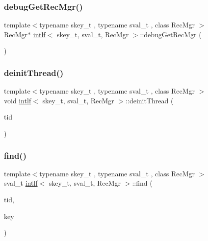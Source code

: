 \subsubsection{\texorpdfstring{debug\+Get\+Rec\+Mgr()}{debugGetRecMgr()}}
{\footnotesize\ttfamily template$<$typename skey\+\_\+t , typename sval\+\_\+t , class Rec\+Mgr $>$ \\
Rec\+Mgr$\ast$ \hyperlink{classintlf}{intlf}$<$ skey\+\_\+t, sval\+\_\+t, Rec\+Mgr $>$\+::debug\+Get\+Rec\+Mgr (\begin{DoxyParamCaption}{ }\end{DoxyParamCaption})\hspace{0.3cm}{\ttfamily [inline]}}

\mbox{\label{classintlf_ab394875c208489665f7d700accdb216d}} 
\subsubsection{\texorpdfstring{deinit\+Thread()}{deinitThread()}}
{\footnotesize\ttfamily template$<$typename skey\+\_\+t , typename sval\+\_\+t , class Rec\+Mgr $>$ \\
void \hyperlink{classintlf}{intlf}$<$ skey\+\_\+t, sval\+\_\+t, Rec\+Mgr $>$\+::deinit\+Thread (\begin{DoxyParamCaption}\item[{const int}]{tid }\end{DoxyParamCaption})\hspace{0.3cm}{\ttfamily [inline]}}

\mbox{\label{classintlf_aeb7ce634a90eca56c3b26412cb48d552}} 
\subsubsection{\texorpdfstring{find()}{find()}}
{\footnotesize\ttfamily template$<$typename skey\+\_\+t , typename sval\+\_\+t , class Rec\+Mgr $>$ \\
sval\+\_\+t \hyperlink{classintlf}{intlf}$<$ skey\+\_\+t, sval\+\_\+t, Rec\+Mgr $>$\+::find (\begin{DoxyParamCaption}\item[{const int}]{tid,  }\item[{skey\+\_\+t}]{key }\end{DoxyParamCaption})\hspace{0.3cm}{\ttfamily [inline]}}

